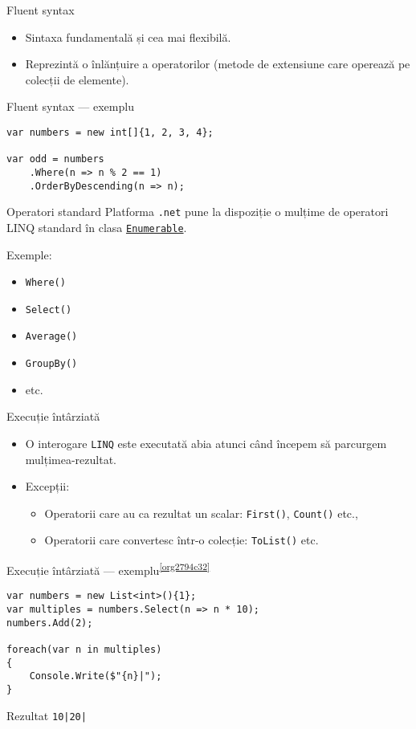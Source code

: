 \documentclass[presentation]{beamer}
\begin{document}
\begin{frame}[label={sec:org1ab3eb9}]{Fluent syntax}
\begin{itemize}
\item Sintaxa fundamentală și cea mai flexibilă.
\item Reprezintă o înlănțuire a operatorilor (metode de extensiune care operează pe colecții de elemente).
\end{itemize}
\end{frame}
\begin{frame}[label={sec:org5252547},fragile]{Fluent syntax --- exemplu}
 \begin{verbatim}
var numbers = new int[]{1, 2, 3, 4};

var odd = numbers
    .Where(n => n % 2 == 1)
    .OrderByDescending(n => n);
\end{verbatim}
\end{frame}
\begin{frame}[label={sec:org383e737},fragile]{Operatori standard}
 Platforma \texttt{.net} pune la dispoziție o mulțime de \alert{operatori LINQ standard} în clasa \href{https://docs.microsoft.com/en-us/dotnet/api/system.linq.enumerable?view=netcore-3.1}{\texttt{Enumerable}}.


Exemple:
\begin{itemize}
\item \texttt{Where()}
\item \texttt{Select()}
\item \texttt{Average()}
\item \texttt{GroupBy()}
\item etc.
\end{itemize}
\end{frame}
\begin{frame}[label={sec:org3408a70},fragile]{Execuție întârziată}
 \begin{itemize}
\item O interogare \texttt{LINQ} este executată abia atunci când începem să parcurgem mulțimea-rezultat.
\item Excepții:
\begin{itemize}
\item Operatorii care au ca rezultat un scalar: \texttt{First()}, \texttt{Count()} etc.,
\item Operatorii care convertesc într-o colecție: \texttt{ToList()} etc.
\end{itemize}
\end{itemize}
\end{frame}
\begin{frame}[label={sec:org1192e5f},fragile]{Execuție întârziată --- exemplu\textsuperscript{\ref{org2794c32}}}
 \begin{verbatim}
var numbers = new List<int>(){1};
var multiples = numbers.Select(n => n * 10);
numbers.Add(2);

foreach(var n in multiples)
{
    Console.Write($"{n}|");
}
\end{verbatim}
\begin{block}{Rezultat}
\texttt{10|20|}
\end{block}
\end{frame}
\end{document}
